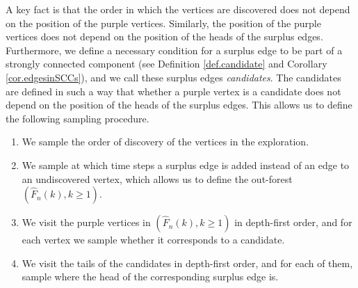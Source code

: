 A key fact is that the order in which the vertices are discovered does not depend on the position of the purple vertices. Similarly, the position of the purple vertices does not depend on the position of the heads of the surplus edges. Furthermore, we define a necessary condition for a surplus edge to be part of a strongly connected component (see Definition \ref{def.candidate} and Corollary \ref{cor.edgesinSCCs}), and we call these surplus edges \emph{candidates}. The candidates are defined in such a way that whether a purple vertex is a candidate does not depend on the position of the heads of the surplus edges. This allows us to define the following sampling procedure.
\begin{enumerate}
    \item We sample the order of discovery of the vertices in the exploration.
    \item We sample at which time steps a surplus edge is added instead of an edge to an undiscovered vertex, which allows us to define the out-forest $(\hat{F}_n(k),k\geq 1)$. 
    \item We visit the purple vertices in $(\hat{F}_n(k),k\geq 1)$ in depth-first order, and for each vertex we sample whether it corresponds to a candidate.
    \item We visit the tails of the candidates in depth-first order, and for each of them, sample where the head of the corresponding surplus edge is.
\end{enumerate}


